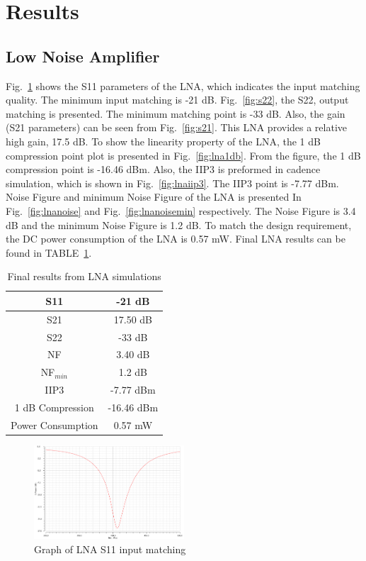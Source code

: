 \section{Results}
\subsection{Low Noise Amplifier}
Fig.~\ref{fig:s11} shows the S11 parameters of the LNA, which indicates the input matching quality. The minimum input matching is -21 dB. Fig.~\ref{fig:s22}, the S22, output matching is presented. The minimum matching point is -33 dB. Also, the gain (S21 parameters) can be seen from Fig.~\ref{fig:s21}. This LNA provides a relative high gain, 17.5 dB. To show the linearity property of the LNA, the 1 dB compression point plot is presented in Fig.~\ref{fig:lna1db}. From the figure, the 1 dB compression point is -16.46 dBm. Also, the IIP3 is preformed in cadence simulation, which is shown in Fig.~\ref{fig:lnaiip3}. The IIP3 point is -7.77 dBm. Noise Figure and minimum Noise Figure of the LNA is presented In Fig.~\ref{fig:lnanoise} and Fig.~\ref{fig:lnanoisemin} respectively. The Noise Figure is 3.4 dB and the minimum Noise Figure is 1.2 dB. To match the design requirement, the DC power consumption of the LNA is 0.57 mW. Final LNA results can be found in TABLE~\ref{tab:lnaresults}.

\begin{table}[H]
\begin{center}
	\begin{tabular}{ c | c  }
 		                      
  		S11 & -21 dB \\ \hline
  		S21 &  17.50 dB \\ \hline
  		S22 & -33 dB \\ \hline
		NF & 3.40 dB\\ \hline
		NF$_{min}$ & 1.2 dB \\ \hline
		IIP3 & -7.77 dBm\\ \hline
		1 dB Compression & -16.46 dBm \\  \hline
		Power Consumption & 0.57 mW \\ 

	\end{tabular}

\end{center}
\caption{Final results from LNA simulations}
\label{tab:lnaresults}
\end{table}

\begin{figure}[h]
   \centering
    \includegraphics[width=0.5\textwidth]{figures/s11.png}
    \caption{Graph of LNA S11 input matching}
    \label{fig:s11}
\end{figure}

